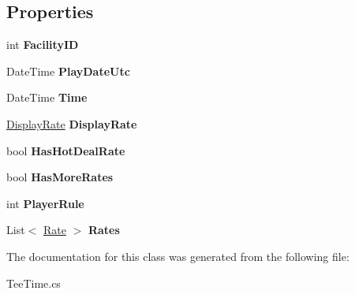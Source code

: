 \subsection*{Properties}
\begin{DoxyCompactItemize}
\item 
\mbox{\label{class_golf_now_a_p_i_1_1_tee_time_acc5b3e5ad229b7f757f68e35615c7b1a}} 
int {\bfseries Facility\+ID}
\item 
\mbox{\label{class_golf_now_a_p_i_1_1_tee_time_a8d0b67b276e4464d057ba91464a6ca2a}} 
Date\+Time {\bfseries Play\+Date\+Utc}
\item 
\mbox{\label{class_golf_now_a_p_i_1_1_tee_time_a042325ec52c145a749f0798e4b34a118}} 
Date\+Time {\bfseries Time}
\item 
\mbox{\label{class_golf_now_a_p_i_1_1_tee_time_af454845f9df8ff47fbbefda9958cce0c}} 
\mbox{\hyperlink{class_golf_now_a_p_i_handler_1_1_display_rate}{Display\+Rate}} {\bfseries Display\+Rate}
\item 
\mbox{\label{class_golf_now_a_p_i_1_1_tee_time_aff17613908ce499c48e952c29b333ccc}} 
bool {\bfseries Has\+Hot\+Deal\+Rate}
\item 
\mbox{\label{class_golf_now_a_p_i_1_1_tee_time_aa6a789b3cecd305e6b077fac90cd02e9}} 
bool {\bfseries Has\+More\+Rates}
\item 
\mbox{\label{class_golf_now_a_p_i_1_1_tee_time_aaa05f9201e2dc83776ba49b4b9593bcc}} 
int {\bfseries Player\+Rule}
\item 
\mbox{\label{class_golf_now_a_p_i_1_1_tee_time_a376fbd7c443281ae33ea42f027041e34}} 
List$<$ \mbox{\hyperlink{class_golf_now_a_p_i_handler_1_1_rate}{Rate}} $>$ {\bfseries Rates}
\end{DoxyCompactItemize}


The documentation for this class was generated from the following file\+:\begin{DoxyCompactItemize}
\item 
Tee\+Time.\+cs\end{DoxyCompactItemize}
